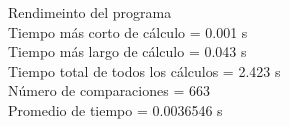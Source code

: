 \newpage
{\Huge Rendimeinto del programa } \\
 Tiempo más corto de cálculo = 	0.001 s\\ Tiempo más largo de cálculo = 	0.043 s\\ Tiempo total de todos los cálculos = 	2.423 s\\ Número de comparaciones = 	663\\ Promedio de tiempo = 	0.0036546 s

 \newpage
